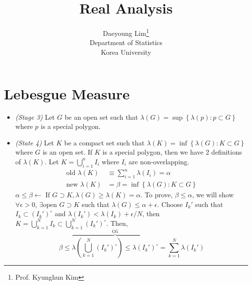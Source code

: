 \documentclass[11pt]{article}
\begin{document}
\nocite{*}

\title{Real Analysis}

\author{Daeyoung Lim\thanks{Prof. Kyunghun Kim} \\
Department of Statistics \\
Korea University}

\maketitle

\section{Lebesgue Measure}
\begin{itemize}
  \item \emph{(Stage 3)} Let $G$ be an open set such that $\lambda\left(G\right)=\sup \left\{\lambda\left(p\right): p\subset G \right\}$ where $p$ is a special polygon.
  \item \emph{(State 4)} Let $K$ be a compact set such that $\lambda\left(K\right)=\inf\left\{\lambda\left(G\right): K \subset G \right\} $ where $G$ is an open set. If $K$ is a special polygon, then we have 2 definitions of $\lambda\left(K\right)$. Let $K=\bigcup_{i=1}^{n} I_{i}$ where $I_{i}$ are non-overlapping.
  \begin{align*}
    \text{old } \lambda\left(K\right) &\equiv \sum_{i=1}^{n}\lambda\left(I_{i}\right) = \alpha\\
    \text{new } \lambda\left(K\right) &= \beta = \inf \left\{\lambda\left(G\right): K \subset G \right\}
  \end{align*}
  $\alpha \leq \beta \leftarrow$ If $G \supset K, \lambda\left(G\right) \geq \lambda\left(K\right) = \alpha $. To prove, $\beta \leq \alpha$, we will show $\forall \epsilon > 0$, $\exists \text{open } G \supset K$ such that $\lambda\left(G\right) \leq \alpha + \epsilon$. Choose $I_{k}'$ such that $I_{k} \subset \left(I_{k}'\right)^{\circ}$ and $\lambda\left(I_{k}'\right) <\lambda\left(I_{k}\right) + \epsilon/N$, then $K = \bigcup_{k=1}^{N}I_{k} \subset \bigcup_{k=1}^{N}\left(I_{k}'\right)^{\circ}$. Then,
  $$
    \beta \leq \overbrace{\lambda\left(\bigcup\limits_{k=1}^{N}\left(I_{k}'\right)^{\circ}\right) \leq \lambda\left(I_{k}'\right)^{\circ}}^{\text{O5}} = \sum_{k=1}^{N}\lambda\left(I_{k}'\right)
  $$
\end{itemize}
\end{document}
